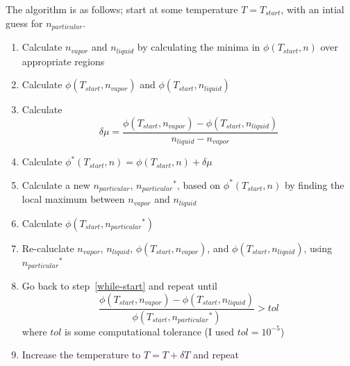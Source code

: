 \documentclass[letterpaper,twocolumn,amsmath,amssymb,prb]{revtex4-1}
\newcommand{\npart}{\ensuremath{n_{particular}}}
\newcommand{\nliq}{\ensuremath{n_{liquid}}}
\newcommand{\nvap}{\ensuremath{n_{vapor}}}
\newcommand{\1}{\ensuremath{\textbf{r}_1}}
\newcommand{\2}{\ensuremath{\textbf{r}_2}}
\newcommand{\3}{\ensuremath{\textbf{r}_3}}
\newcommand{\4}{\ensuremath{\textbf{r}_4}}
\begin{document}
The algorithm is as follows; start at some temperature $T=T_{start}$, with an intial guess for $\npart$.
\begin{enumerate}
  \item Calculate $\nvap$ and $\nliq$ by calculating the minima in $\phi(T_{start},n)$ over appropriate regions
  \item Calculate $\phi(T_{start},\nvap)$ and $\phi(T_{start},\nliq)$ \label{while-start}
  \item Calculate \[\delta\mu = \frac{\phi(T_{start},\nvap) - \phi(T_{start},\nliq)}{\nliq - \nvap}\]
  \item Calculate $\phi^*(T_{start},n) = \phi(T_{start},n) + \delta\mu$
  \item Calculate a new $\npart$, $\npart^*$, based on $\phi^*(T_{start},n)$ by finding the local maximum between $\nvap$ and $\nliq$
  \item Calculate $\phi(T_{start},\npart^*)$
  \item Re-caluclate $\nvap$, $\nliq$, $\phi(T_{start},\nvap)$, and $\phi(T_{start},\nliq)$, using $\npart^*$
  \item Go back to step~\ref{while-start} and repeat until \[ \frac{\phi(T_{start},\nvap) - \phi(T_{start},\nliq)}{\phi(T_{start},\npart^*)} > tol  \] where $tol$ is some computational tolerance (I used $tol=10^{-5}$)
  \item Increase the temperature to $T = T + \delta T$ and repeat
\end{enumerate}
\end{document}
